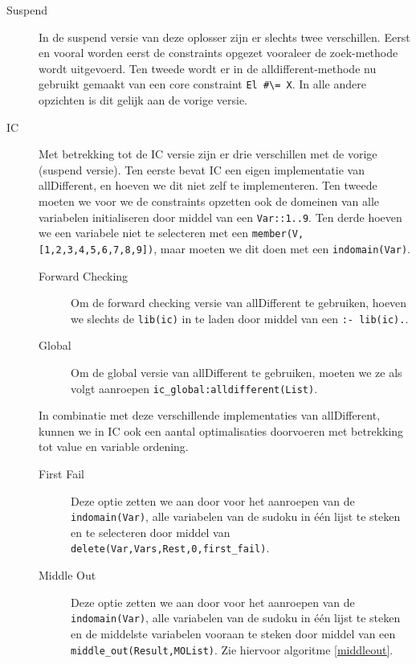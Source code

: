 \begin{description}
\begin{description}
         \item[Suspend] In de suspend versie van deze oplosser zijn er slechts twee verschillen. Eerst en vooral worden
                eerst de constraints opgezet vooraleer de zoek-methode wordt uitgevoerd. Ten tweede wordt er in de
                alldifferent-methode nu gebruikt gemaakt van een core constraint \verb|El #\= X|. In alle andere opzichten
                is dit gelijk aan de vorige versie.
         \item[IC] Met betrekking tot de IC versie zijn er drie verschillen met de vorige (suspend versie). Ten
                eerste bevat IC een eigen implementatie van allDifferent, en hoeven we dit niet zelf te implementeren.
                Ten tweede moeten we voor we de constraints opzetten ook de domeinen van alle variabelen initialiseren
                door middel van een \verb|Var::1..9|. Ten derde hoeven we een variabele niet te selecteren met
                een \verb|member(V,[1,2,3,4,5,6,7,8,9])|, maar moeten we dit doen met een \verb|indomain(Var)|.
                \begin{description}
                 \item[Forward Checking] Om de forward checking versie van allDifferent te gebruiken, hoeven we slechts
                        de \verb|lib(ic)| in te laden door middel van een \verb|:- lib(ic).|.
                 \item[Global] Om de global versie van allDifferent te gebruiken, moeten we ze als
                        volgt aanroepen \verb|ic_global:alldifferent(List)|.
                \end{description}
                In combinatie met deze verschillende implementaties van allDifferent, kunnen we in IC ook een aantal
                optimalisaties doorvoeren met betrekking tot value en variable ordening.
                \begin{description}
                 \item[First Fail] Deze optie zetten we aan door voor het aanroepen van de \verb|indomain(Var)|, 
                        alle variabelen van de sudoku in \'e\'en lijst te steken en te selecteren door middel van
                        \verb|delete(Var,Vars,Rest,0,first_fail)|.
                 \item[Middle Out] Deze optie zetten we aan door voor het aanroepen van de \verb|indomain(Var)|, 
                        alle variabelen van de sudoku in \'e\'en lijst te steken en de middelste variabelen
                        vooraan te steken door middel van een \verb|middle_out(Result,MOList)|. Zie hiervoor algoritme \ref{middleout}.

\end{description}
\end{description}
\end{description}
